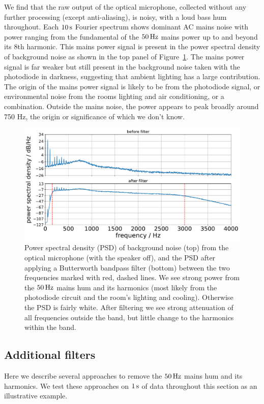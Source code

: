 \documentclass[paper-main.tex]{subfiles}
\begin{document}
We find that the raw output of the optical microphone, collected without any further processing (except anti-aliasing), is noisy, with a loud bass hum throughout.
Each $10\,{\rm s}$ Fourier spectrum shows dominant AC mains noise with power ranging from the fundamental of the $50\,{\rm Hz}$ mains power up to and beyond its $8$th harmonic. 
This mains power signal is present in the power spectral density of background noise as shown in the top panel of Figure~\ref{fig:psd_noise}.
The mains power signal is far weaker but still present in the background noise taken with the photodiode in darkness, suggesting that ambient lighting has a large contribution.
The origin of the mains power signal is likely to be from the photodiode signal, or environmental noise from the rooms lighting and air conditioning, or a combination. 
Outside the mains noise, the power appears to peak broadly around 750 Hz, the origin or significance of which we don't know. 

\begin{figure}
	\includegraphics[width=.49\textwidth]{figures/psd_butterworth_14_6.pdf}
	\caption{\label{fig:psd_noise}
Power spectral density (PSD) of background noise (top) from the optical microphone (with the speaker off), and the PSD after applying a Butterworth bandpass filter (bottom) between the two frequencies marked with red, dashed lines. 
We see strong power from the $50\,{\rm Hz}$ mains hum and its harmonics (most likely from the photodiode circuit and the room’s lighting and cooling). Otherwise the PSD is fairly white. 
After filtering we see strong attenuation of all frequencies outside the band, but little change to the harmonics within the band.
}
\end{figure}


\subsection{Additional filters}
\label{sec:simple_filters}

Here we describe several approaches to remove the $50\,{\rm Hz}$ mains hum and its harmonics. 
We test these approaches on $1\,{\rm s}$ of data throughout this section as an illustrative example. 
\end{document}
